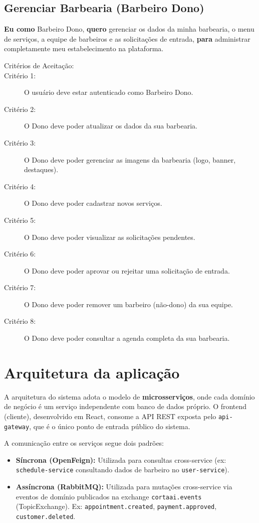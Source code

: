 \documentclass[
    12pt, 
    a4paper, 
    oneside, 
    chapter=TITLE, 
    section=TITLE
]{abntex2}
\begin{document}
\subsection{Gerenciar Barbearia (Barbeiro Dono)}
\textbf{Eu como} Barbeiro Dono, \textbf{quero} gerenciar os dados da minha barbearia, o menu de serviços, a equipe de barbeiros e as solicitações de entrada, \textbf{para} administrar completamente meu estabelecimento na plataforma.
\begin{description}
    \item[Critérios de Aceitação:]
    \item[Critério 1:] O usuário deve estar autenticado como Barbeiro Dono.
    \item[Critério 2:] O Dono deve poder atualizar os dados da sua barbearia.
    \item[Critério 3:] O Dono deve poder gerenciar as imagens da barbearia (logo, banner, destaques).
    \item[Critério 4:] O Dono deve poder cadastrar novos serviços.
    \item[Critério 5:] O Dono deve poder visualizar as solicitações pendentes.
    \item[Critério 6:] O Dono deve poder aprovar ou rejeitar uma solicitação de entrada.
    \item[Critério 7:] O Dono deve poder remover um barbeiro (não-dono) da sua equipe.
    \item[Critério 8:] O Dono deve poder consultar a agenda completa da sua barbearia.
\end{description}

\section{Arquitetura da aplicação}
A arquitetura do sistema adota o modelo de \textbf{microsserviços}, onde cada domínio de negócio é um serviço independente com banco de dados próprio. O frontend (cliente), desenvolvido em React, consome a API REST exposta pelo \texttt{api-gateway}, que é o único ponto de entrada público do sistema.

A comunicação entre os serviços segue dois padrões:
\begin{itemize}
    \item \textbf{Síncrona (OpenFeign):} Utilizada para consultas cross-service (ex: \texttt{schedule-service} consultando dados de barbeiro no \texttt{user-service}).
    \item \textbf{Assíncrona (RabbitMQ):} Utilizada para mutações cross-service via eventos de domínio publicados na exchange \texttt{cortaai.events} (TopicExchange). Ex: \texttt{appointment.created}, \texttt{payment.approved}, \texttt{customer.deleted}.
\end{itemize}
\end{document}
